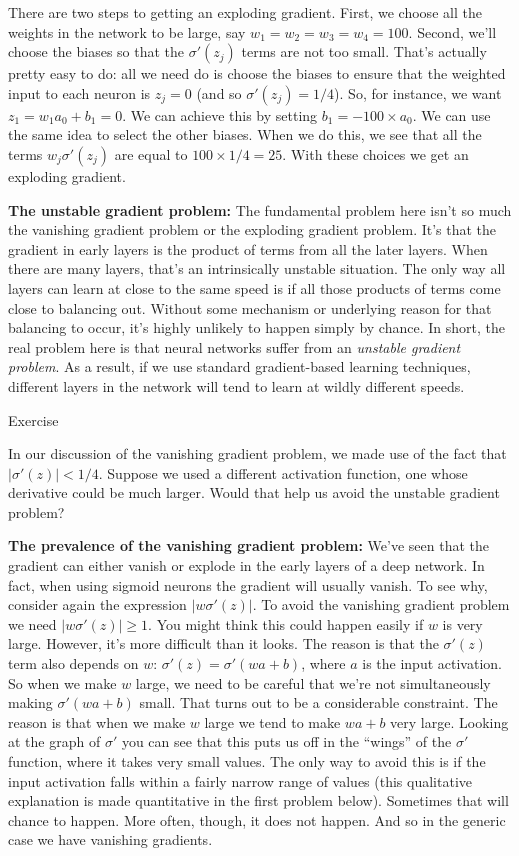 \documentclass[a4paper,twoside,10pt]{book}
\begin{document}
There are two steps to getting an exploding gradient. First, we choose all the weights in the network to be large, say $w_1=w_2=w_3=w_4=100$. Second, we'll choose the biases so that the $\sigma'(z_j)$ terms are not too small. That's actually pretty easy to do: all we need do is choose the biases to ensure that the weighted input to each neuron is $z_j=0$ (and so $\sigma'(z_j)=1/4$). So, for instance, we want $z_1=w_1a_0+b_1=0$. We can achieve this by setting $b_1=-100\times a_0$. We can use the same idea to select the other biases. When we do this, we see that all the terms $w_j\sigma'(z_j)$ are equal to $100\times1/4=25$. With these choices we get an exploding gradient.

\textbf{The unstable gradient problem:} The fundamental problem here isn't so much the vanishing gradient problem or the exploding gradient problem. It's that the gradient in early layers is the product of terms from all the later layers. When there are many layers, that's an intrinsically unstable situation. The only way all layers can learn at close to the same speed is if all those products of terms come close to balancing out. Without some mechanism or underlying reason for that balancing to occur, it's highly unlikely to happen simply by chance. In short, the real problem here is that neural networks suffer from an \textit{unstable gradient problem}. As a result, if we use standard gradient-based learning techniques, different layers in the network will tend to learn at wildly different speeds.

\begin{exercize}{Exercise}
\item In our discussion of the vanishing gradient problem, we made use of the fact that $|\sigma'(z)|<1/4$. Suppose we used a different activation function, one whose derivative could be much larger. Would that help us avoid the unstable gradient problem?
\end{exercize}
\textbf{The prevalence of the vanishing gradient problem:} We've seen that the gradient can either vanish or explode in the early layers of a deep network. In fact, when using sigmoid neurons the gradient will usually vanish. To see why, consider again the expression $|w\sigma'(z)|$. To avoid the vanishing gradient problem we need $|w\sigma'(z)|\geq1$. You might think this could happen easily if $w$ is very large. However, it's more difficult than it looks. The reason is that the $\sigma'(z)$ term also depends on $w$: $\sigma'(z)=\sigma'(wa+b)$, where $a$ is the input activation. So when we make $w$ large, we need to be careful that we're not simultaneously making $\sigma'(wa+b)$ small. That turns out to be a considerable constraint. The reason is that when we make $w$ large we tend to make $wa+b$ very large. Looking at the graph of $\sigma'$ you can see that this puts us off in the ``wings'' of the $\sigma'$ function, where it takes very small values. The only way to avoid this is if the input activation falls within a fairly narrow range of values (this qualitative explanation is made quantitative in the first problem below). Sometimes that will chance to happen. More often, though, it does not happen. And so in the generic case we have vanishing gradients.
\end{document}
